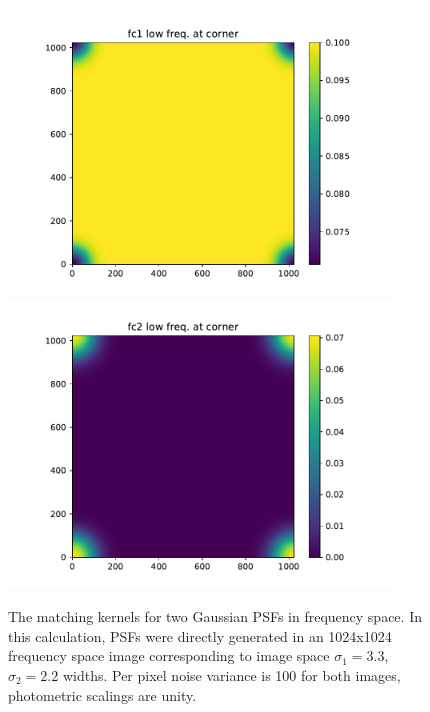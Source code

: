 \documentclass[11pt]{article}
\begin{document}
\begin{figure}
\begin{center}
  \includegraphics[width=4in]{fig/fft_steps_direct_fc1.pdf}
  \includegraphics[width=4in]{fig/fft_steps_direct_fc2.pdf}
\end{center}
\caption{\label{fig:fft_steps_direct_fc1fc2}The matching kernels for two
  Gaussian PSFs in frequency space. In this calculation, PSFs were
  directly generated in an 1024x1024 frequency space image
  corresponding to image space \(\sigma_1=3.3\), \(\sigma_2=2.2\)
  widths. Per pixel noise variance is 100 for both images, photometric
  scalings are unity.}
\end{figure}
%
\end{document}
